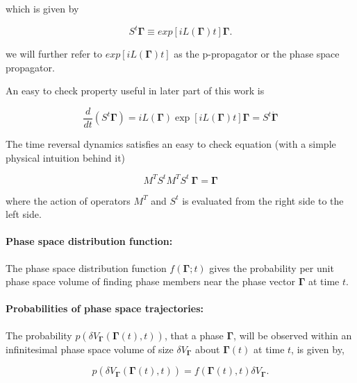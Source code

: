 \documentclass[a4paper,12pt]{article}
\begin{document}
which is given by

\begin{equation}
  S^t \bm{\Gamma} \equiv exp[iL(\bm{\Gamma})t]\bm{\Gamma}.
\end{equation}


we will further refer to $ exp[iL(\bm{\Gamma})t] $ as the p-propagator or the phase space propagator.


An easy to check property useful in later part of this work is

\begin{equation}
\label{PhaseTimeDer}
  \frac{d}{dt}(S^t \bm{\Gamma})=iL(\bm{\Gamma})\exp[iL(\bm{\Gamma})t]\bm{\Gamma}=S^t \dot{\bm{\Gamma}}
\end{equation}



The time reversal dynamics satisfies an easy to check equation (with a simple physical intuition behind it)

\begin{equation}
  M^T S^t M^T S^t\ \bm{\Gamma} = \bm{\Gamma}
\end{equation}

where the action of operators $M^T$ and $S^t$ is evaluated from the right side to the left side.






\paragraph{Phase space distribution function:}

The phase space distribution function $f(\bm{\Gamma};t)$ gives the probability per unit phase space volume of finding phase members near the phase vector $\bm{\Gamma}$ at time $t$.

\paragraph{Probabilities of phase space trajectories: }
The probability $p(\delta V_{\bm{\Gamma}}(\bm{\Gamma}(t),t))$, that a phase $\bm{\Gamma}$, will be observed within an infinitesimal phase space volume of size $\delta V_{\bm{\Gamma}}$ about $\bm{\Gamma}(t)$ at time $t$, is given by,

\begin{equation}
  p(\delta V_{\bm{\Gamma}}(\bm{\Gamma}(t),t)) = f(\bm{\Gamma}(t),t)\delta V_{\bm{\Gamma}}.
\end{equation}
\end{document}
